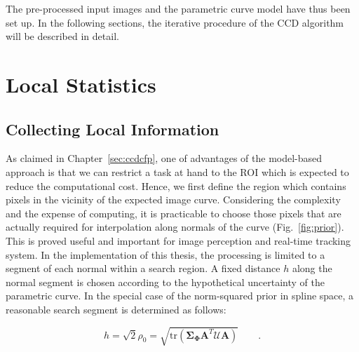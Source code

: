 The pre-processed input images and the parametric curve model have
thus been set up. In the following sections, the iterative procedure of the
CCD algorithm will be described in detail.

\section{Local Statistics}
\label{sec:ls}

\subsection{Collecting Local Information}
\label{sec:cls}

As claimed in Chapter~\ref{sec:ccdcfp}, one of advantages of the
model-based approach is that we can restrict a task at hand to the ROI
which is
expected to reduce the computational cost. Hence, we first define
the region which contains pixels in the vicinity of the expected image
curve. Considering the complexity and the expense of computing, it is practicable
to choose those pixels that are actually required for interpolation along
normals of the curve (Fig.~\ref{fig:prior}). This is proved useful and important for image
perception and real-time tracking system. In the implementation of
this thesis, the processing is limited to a segment of each normal within
a search region. A fixed distance $h$ along the normal segment is
chosen according to the hypothetical uncertainty of the parametric curve. In the
special case of the norm-squared prior in spline space, a reasonable
search segment is determined as follows:

\begin{equation}
  \label{eq:radius}
  h = \sqrt{2} \rho_0 = \sqrt{\mathrm{tr}(\mathbf{\Sigma}_{\mathbf{\Phi}}\mathbf{A}^T\mathcal{U}\mathbf{A})}\qquad.
\end{equation}

